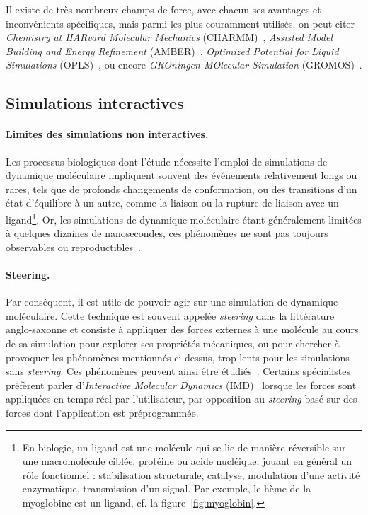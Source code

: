 	
	Il existe de très nombreux champs de force, avec chacun ses avantages et inconvénients spécifiques, mais parmi les plus couramment utilisés, on peut citer \emph{Chemistry at HARvard Molecular Mechanics} (CHARMM)~\cite{brooks1983charmm, brooks2009charmm}, \emph{Assisted Model Building and Energy Refinement} (AMBER)~\cite{cornell1995second, wang2004development}, \emph{Optimized Potential for Liquid Simulations} (OPLS)~\cite{jorgensen1996development, kaminski2001evaluation}, ou encore \emph{GROningen MOlecular Simulation} (GROMOS)~\cite{scott1999gromos, oostenbrink2004biomolecular}.
	
    
	\subsection{Simulations interactives}
	\paragraph{Limites des simulations non interactives.}
	Les processus biologiques dont l'étude nécessite l'emploi de simulations de dynamique moléculaire impliquent souvent des événements relativement longs ou rares, tels que de profonds changements de conformation, ou des transitions d'un état d'équilibre à un autre, comme la liaison ou la rupture de liaison avec un ligand\footnote{En biologie, un ligand est une molécule qui se lie de manière réversible sur une macromolécule ciblée, protéine ou acide nucléique, jouant en général un rôle fonctionnel : stabilisation structurale, catalyse, modulation d'une activité enzymatique, transmission d'un signal. Par exemple, le hème de la myoglobine est un ligand, cf. la figure~\ref{fig:myoglobin}.}. Or, les simulations de dynamique moléculaire étant généralement limitées à quelques dizaines de nanosecondes, ces phénomènes ne sont pas toujours observables ou reproductibles~\cite{phillips2005scalable}.
	
	\paragraph{Steering.}
	Par conséquent, il est utile de pouvoir agir sur une simulation de dynamique moléculaire. Cette technique est souvent appelée \emph{steering} dans la littérature anglo-saxonne et consiste à appliquer des forces externes à une molécule au cours de sa simulation pour explorer ses propriétés mécaniques, ou pour chercher à provoquer les phénomènes mentionnés ci-dessus, trop lents pour les simulations sans \emph{steering}. Ces phénomènes peuvent ainsi être étudiés~\cite{izrailev1999steered, isralewitz2001steered, isralewitz2001steered}. Certains spécialistes~\cite{phillips2005scalable} préfèrent parler d'\emph{Interactive Molecular Dynamics} (IMD)~\cite{stone2001system, grayson2003mechanisms} lorsque les forces sont appliquées en temps réel par l'utilisateur, par opposition au \emph{steering} basé sur des forces dont l'application est préprogrammée.
	
